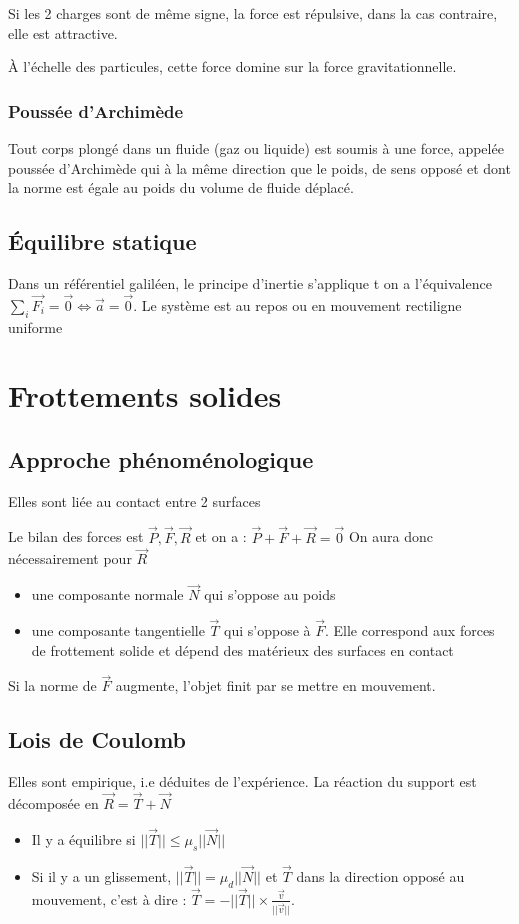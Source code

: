 \documentclass[french]{yLectureNote}
\renewcommand{\vec}{\overrightarrow}
\newcommand{\norm}[1]{||\vec{#1}||}
\begin{document}
Si les 2 charges sont de m\^eme signe, la force est répulsive, dans la cas contraire, elle est attractive.

À l'échelle des particules, cette force domine sur la force gravitationnelle.

\subsubsection{Poussée d'Archimède}

\begin{theorem}
Tout corps plongé dans un fluide (gaz ou liquide) est soumis à une force, appelée poussée d'Archimède qui à la m\^eme direction que le poids, de sens opposé et dont la norme est égale au poids du volume de fluide déplacé.
\end{theorem}
 \subsection{Équilibre statique}
 Dans un référentiel galiléen, le principe d'inertie s'applique t on a l'équivalence $\sum_i \vec{F_i} = \vec{0} \iff \vec{a} = \vec{0}$. Le système est au repos ou en mouvement rectiligne uniforme

\section{Frottements solides}
\subsection{Approche phénoménologique}
\begin{theorem}[Définition]
Elles sont liée au contact entre 2 surfaces
\end{theorem}
Le bilan des forces est $\vec{P},\vec{F},\vec{R}$ et on a : $\vec{P}+\vec{F}+\vec{R} = \vec{0}$ On aura donc nécessairement pour $\vec{R}$
\begin{itemize}
 \item une composante normale $\vec{N}$ qui s'oppose au poids
 \item une composante tangentielle $\vec{T}$ qui s'oppose à $\vec{F}$. Elle correspond aux forces de frottement solide et dépend des matérieux des surfaces en contact
\end{itemize}
Si la norme de $\vec{F}$ augmente, l'objet finit par se mettre en mouvement.

\subsection{Lois de Coulomb}
Elles sont empirique, i.e déduites de l'expérience. La réaction du support est décomposée en $\vec{R} = \vec{T}+\vec{N}$
\begin{theorem}[Lois]
\begin{itemize}
 \item Il y a équilibre si $\norm{T} \leq \mu_s \norm{N}$
 \item Si il y a un glissement, $\norm{T} = \mu_d \norm{N}$ et $\vec{T}$ dans la direction opposé au mouvement, c'est à dire : $\vec{T} = -\norm{T}\times \frac{\vec{v}}{\norm{v}}$.
\end{itemize}
\end{theorem}
\end{document}
